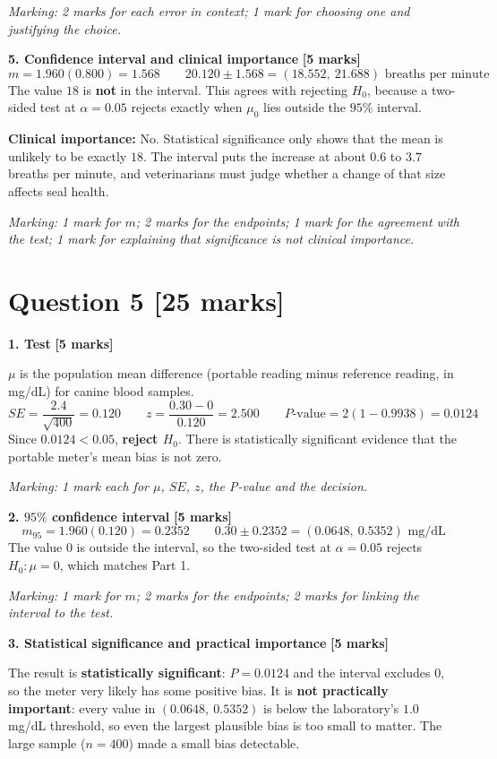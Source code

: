 \documentclass[10pt,letterpaper]{article}
\newcommand{\partmarks}[1]{\hfill\textbf{[#1 marks]}}
\newcommand{\allocation}[1]{\par\smallskip\textit{Marking: #1}\par}
\begin{document}
\allocation{2 marks for each error in context; 1 mark for choosing one and justifying the choice.}

\textbf{5. Confidence interval and clinical importance} \partmarks{5}
$$m=1.960(0.800)=1.568 \qquad 20.120\pm1.568=\boxed{(18.552,\ 21.688)\text{ breaths per minute}}$$
The value $18$ is \textbf{not} in the interval. This agrees with rejecting $H_0$, because a two-sided test at $\alpha=0.05$ rejects exactly when $\mu_0$ lies outside the $95\%$ interval.

\textbf{Clinical importance:} No. Statistical significance only shows that the mean is unlikely to be exactly $18$. The interval puts the increase at about $0.6$ to $3.7$ breaths per minute, and veterinarians must judge whether a change of that size affects seal health.

\allocation{1 mark for $m$; 2 marks for the endpoints; 1 mark for the agreement with the test; 1 mark for explaining that significance is not clinical importance.}

\newpage
\section*{Question 5 \hfill [25 marks]}

\textbf{1. Test} \partmarks{5}

$\mu$ is the population mean difference (portable reading minus reference reading, in mg/dL) for canine blood samples.
$$SE=\frac{2.4}{\sqrt{400}}=0.120 \qquad z=\frac{0.30-0}{0.120}=\boxed{2.500} \qquad P\text{-value}=2(1-0.9938)=\boxed{0.0124}$$
Since $0.0124<0.05$, \textbf{reject $H_0$}. There is statistically significant evidence that the portable meter's mean bias is not zero.

\allocation{1 mark each for $\mu$, $SE$, $z$, the P-value and the decision.}

\textbf{2. $95\%$ confidence interval} \partmarks{5}
$$m_{95}=1.960(0.120)=0.2352 \qquad 0.30\pm0.2352=\boxed{(0.0648,\ 0.5352)\text{ mg/dL}}$$
The value $0$ is outside the interval, so the two-sided test at $\alpha=0.05$ rejects $H_0:\mu=0$, which matches Part 1.

\allocation{1 mark for $m$; 2 marks for the endpoints; 2 marks for linking the interval to the test.}

\textbf{3. Statistical significance and practical importance} \partmarks{5}

The result is \textbf{statistically significant}: $P=0.0124$ and the interval excludes $0$, so the meter very likely has some positive bias. It is \textbf{not practically important}: every value in $(0.0648,\ 0.5352)$ is below the laboratory's $1.0$ mg/dL threshold, so even the largest plausible bias is too small to matter. The large sample ($n=400$) made a small bias detectable.
\end{document}

